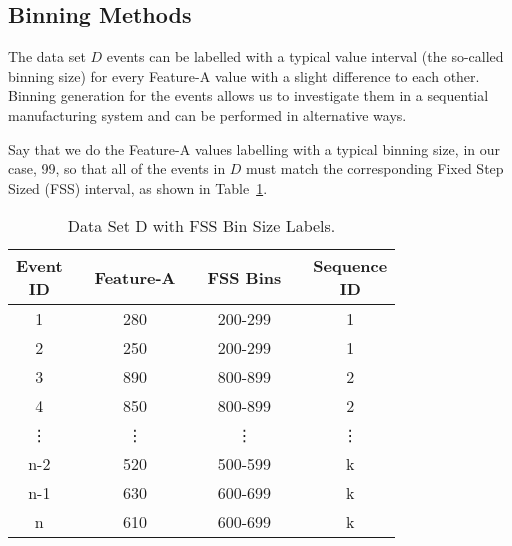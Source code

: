 \subsection*{Binning Methods}
%

The data set $D$ events can be labelled with a typical value interval (the so-called binning size) for every Feature-A value with a slight difference to each other. Binning generation for the events allows us to investigate them in a {\color{red}sequential manufacturing system} and can be performed in alternative ways.

Say that we do the Feature-A values labelling with a typical binning size, in our case, 99, so that all of the events in $D$ must match the corresponding Fixed Step Sized (FSS) interval, as shown in Table~\ref{Tab: D-dataset-FSS}. 
\begin{table}[hb!]
	\centering
	\setlength{\arrayrulewidth}{0.75pt}%
	\begin{tabular}{|cc|c|ccc|c|}
		\hline \rowcolor[HTML]{FFFFC7}
		\makecell{Event\\ID} 	&& Feature-A    	&& FSS Bins && \makecell{Sequence\\ID}  \\ \hline
		1 	      && 280	    && 200-299	&& 1 		     \\
		2 		  && 250	    && 200-299	&& 1 		     \\
		3 	      && 890	    && 800-899	&& 2 		     \\
		4 		  && 850	    && 800-899	&& 2 		     \\
		\vdots	  && \vdots  	&& \vdots	&& \vdots 	     \\
		n-2 	  && 520	    && 500-599	&& k 		     \\
		n-1       && 630	    && 600-699	&& k 		     \\
		n 		  && 610	    && 600-699	&& k 		     \\ \hline
	\end{tabular}
	\caption{Data Set D with FSS Bin Size Labels.}
	\label{Tab: D-dataset-FSS}
\end{table}

